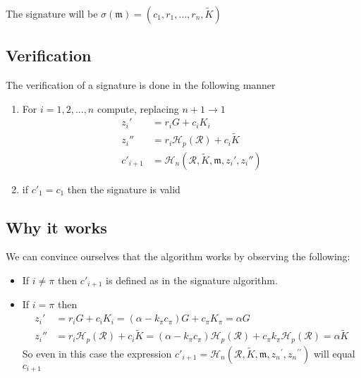 The signature will be \(\sigma(\mathfrak{m}) = (c_1, r_1, ..., r_n, \tilde{K}) \)

\subsection*{Verification}

The verification of a signature is done in the following manner

\begin{enumerate}
	\item  For \(i = 1, 2, ..., n\) compute, replacing \(n + 1 \rightarrow 1\)
	\begin{align*}
	z_i'       &= r_i G + c_i {K_i} \\
	z_i''      & = r_i \mathcal{H}_p(\mathcal{R}) + c_i \tilde{K} \\
	c'_{i+1}   &= \mathcal{H}_n(\mathcal{R}, \tilde{K}, \mathfrak{m}, {z_i}', {z_i}'')
	\end{align*}
	
	\item if \(c'_1 = c_1\) then the signature is valid
\end{enumerate}



\subsection*{Why it works}

We can convince ourselves that the algorithm works by observing the following:

\begin{itemize}
	
	\item[]If \(i \ne \pi\) then \(c'_{i+1}\) is defined as in the signature algorithm.

	\item[] If \(i = \pi\) then 
	\begin{align*}
	   z_i'  &= r_i G + c_i K_i = (\alpha - k_\pi c_\pi) G + c_\pi K_\pi = \alpha G \\
	   z_i'' &= r_i \mathcal{H}_p(\mathcal{R}) + c_i \tilde{K} = (\alpha - k_\pi c_\pi) \mathcal{H}_p(\mathcal{R}) + c_\pi k_\pi \mathcal{H}_p(\mathcal{R}) =  \alpha \tilde{K}
    \end{align*}
    So even in this case the expression \(c'_{i+1} = \mathcal{H}_n(\mathcal{R}, \tilde{K}, \mathfrak{m}, {z_n}^\prime, {z_n}^{\prime\prime})\) will equal \(c_{i+1}\)
\end{itemize}


